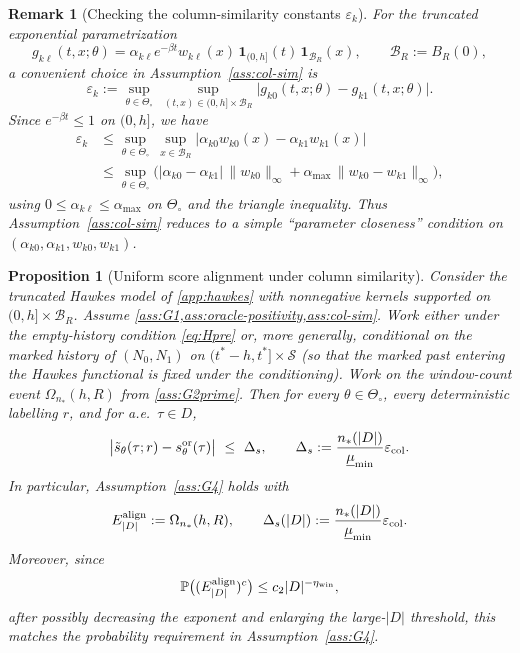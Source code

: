 \documentclass{statsoc}
\newtheorem{proposition}[proposition]{Proposition}
\newtheorem{remark}[remark]{Remark}
\newcommand{\1}{\mathbbm{1}}
\begin{document}
\begin{remark}[Checking the column-similarity constants $\varepsilon_k$]\label{rem:epsk-check}
For the truncated exponential parametrization
\[
g_{k\ell}(t,x;\theta)
=\alpha_{k\ell}e^{-\beta t}w_{k\ell}(x)\,\mathbf 1_{(0,h]}(t)\,\mathbf 1_{\mathcal B_R}(x),
\qquad \mathcal B_R:=B_R(0),
\]
a convenient choice in Assumption~\ref{ass:col-sim} is
\[
\varepsilon_k
:=\sup_{\theta\in\Theta_\circ}\ \sup_{(t,x)\in(0,h]\times\mathcal B_R}
\big|g_{k0}(t,x;\theta)-g_{k1}(t,x;\theta)\big|.
\]
Since $e^{-\beta t}\le 1$ on $(0,h]$, we have
\begin{align*}
\varepsilon_k
&\le \sup_{\theta\in\Theta_\circ}\ \sup_{x\in\mathcal B_R}
\big|\alpha_{k0}w_{k0}(x)-\alpha_{k1}w_{k1}(x)\big| \\
&\le \sup_{\theta\in\Theta_\circ}
\Big(
|\alpha_{k0}-\alpha_{k1}|\,\|w_{k0}\|_\infty
+\alpha_{\max}\,\|w_{k0}-w_{k1}\|_\infty
\Big),
\end{align*}
using $0\le \alpha_{k\ell}\le \alpha_{\max}$ on $\Theta_\circ$ and the triangle inequality.
Thus Assumption~\ref{ass:col-sim} reduces to a simple ``parameter closeness'' condition on
$(\alpha_{k0},\alpha_{k1},w_{k0},w_{k1})$.
\end{remark}

\begin{proposition}[Uniform score alignment under column similarity]
\label{prop:hawkes-G4}
Consider the truncated Hawkes model of \cref{app:hawkes} with nonnegative kernels supported on
$(0,h]\times \mathcal B_R$.
Assume \cref{ass:G1,ass:oracle-positivity,ass:col-sim}.
Work either under the empty-history condition \eqref{eq:Hpre} or, more generally, conditional on the
marked history of $(N_0,N_1)$ on $(t^\ast-h,t^\ast]\times\mathcal S$ (so that the marked past entering the Hawkes functional is fixed under the conditioning).
Work on the window-count event $\Omega_{n_*}(h,R)$ from \cref{ass:G2prime}.
Then for every $\theta\in\Theta_\circ$, every deterministic labelling $r$, and for a.e.\ $\tau\in D$,
\[
\big|\tilde s_\theta(\tau;r)-s^{\rm or}_\theta(\tau)\big|
\ \le\ \Delta_s,
\qquad
\Delta_s := \frac{n_*(|D|)}{\underline\mu_{\min}}\varepsilon_{\rm col}.
\]
In particular, Assumption~\ref{ass:G4} holds with
\[
E^{\rm align}_{|D|}:=\Omega_{n_*}(h,R),
\qquad
\Delta_s(|D|):=\frac{n_*(|D|)}{\underline\mu_{\min}}\varepsilon_{\rm col}.
\]
Moreover, since
\[
\mathbb P\big((E^{\rm align}_{|D|})^c\big)\le c_2|D|^{-\eta_{\rm win}},
\]
after possibly decreasing the exponent and enlarging the large-\(|D|\) threshold, this matches the probability requirement in Assumption~\ref{ass:G4}.
\end{proposition}
\end{document}
